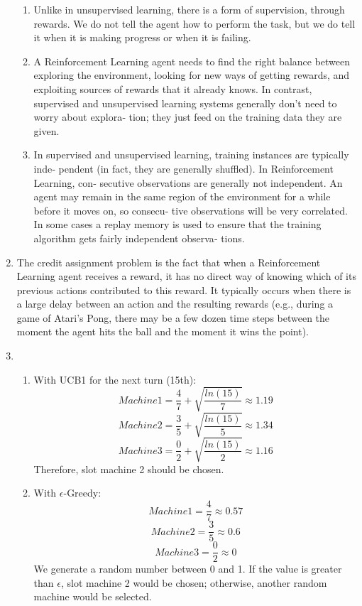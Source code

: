 \documentclass[12pt]{article}
\begin{document}
\begin{enumerate}
\begin{enumerate}
	\item Unlike in unsupervised learning, there is a form of supervision, through rewards. We do not tell the agent how to perform the task, but we do tell it when it is making progress or when it is failing.
	\item A Reinforcement Learning agent needs to find the right balance between exploring the environment, looking for new ways of getting rewards, and exploiting sources of rewards that it already knows. In contrast, supervised and unsupervised learning systems generally don’t need to worry about explora‐ tion; they just feed on the training data they are given.
	\item In supervised and unsupervised learning, training instances are typically inde‐ pendent (in fact, they are generally shuffled). In Reinforcement Learning, con‐ secutive observations are generally not independent. An agent may remain in the same region of the environment for a while before it moves on, so consecu‐ tive observations will be very correlated. In some cases a replay memory is used to ensure that the training algorithm gets fairly independent observa‐ tions.
\end{enumerate}
\item The credit assignment problem is the fact that when a Reinforcement Learning agent receives a reward, it has no direct way of knowing which of its previous actions contributed to this reward. It typically occurs when there is a large delay between an action and the resulting rewards (e.g., during a game of Atari’s Pong, there may be a few dozen time steps between the moment the agent hits the ball and the moment it wins the point).
\item
\begin{enumerate}
	\item With UCB1 for the next turn (15th):
	\begin{equation}
	Machine1 = \frac{4}{7} + \sqrt{\frac{ln(15)}{7}} \approx 1.19
	\end{equation}
	\begin{equation}
	Machine2 = \frac{3}{5} + \sqrt{\frac{ln(15)}{5}} \approx 1.34
	\end{equation}
	\begin{equation}
	Machine3 = \frac{0}{2} + \sqrt{\frac{ln(15)}{2}} \approx 1.16
	\end{equation}
	Therefore, slot machine 2 should be chosen.

	\item With $\epsilon$-Greedy:
	\begin{equation}
	Machine1 = \frac{4}{7} \approx 0.57
	\end{equation}
	\begin{equation}	
	Machine2 = \frac{3}{5} \approx 0.6
	\end{equation}
	\begin{equation}	
	Machine3 = \frac{0}{2} \approx 0
	\end{equation}
	We generate a random number between 0 and 1. If the value is greater than $\epsilon$, slot machine 2 would be chosen; otherwise, another random machine would be selected.
\end{enumerate}



\end{enumerate}
\end{document}
